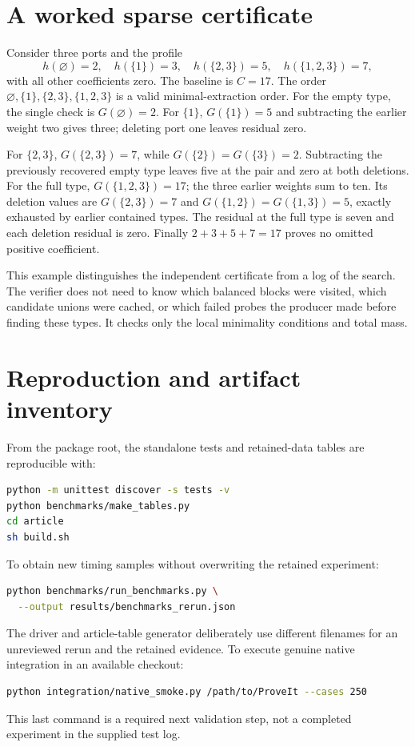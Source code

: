 \documentclass[11pt]{article}
\theoremstyle{definition}
\begin{document}
\appendix
\section{A worked sparse certificate}
\label{app:example}
Consider three ports and the profile
\[
 h(\varnothing)=2,\quad h(\{1\})=3,\quad
 h(\{2,3\})=5,\quad h(\{1,2,3\})=7,
\]
with all other coefficients zero. The baseline is $C=17$. The order
$\varnothing,\{1\},\{2,3\},\{1,2,3\}$ is a valid minimal-extraction order.
For the empty type, the single check is $G(\varnothing)=2$. For $\{1\}$,
$G(\{1\})=5$ and subtracting the earlier weight two gives three; deleting
port one leaves residual zero.

For $\{2,3\}$, $G(\{2,3\})=7$, while
$G(\{2\})=G(\{3\})=2$. Subtracting the previously recovered empty type
leaves five at the pair and zero at both deletions. For the full type,
$G(\{1,2,3\})=17$; the three earlier weights sum to ten. Its deletion values
are $G(\{2,3\})=7$ and
$G(\{1,2\})=G(\{1,3\})=5$, exactly exhausted by earlier contained types.
The residual at the full type is seven and each deletion residual is zero.
Finally $2+3+5+7=17$ proves no omitted positive coefficient.

This example distinguishes the independent certificate from a log of the
search. The verifier does not need to know which balanced blocks were
visited, which candidate unions were cached, or which failed probes the
producer made before finding these types. It checks only the local
minimality conditions and total mass.

\section{Reproduction and artifact inventory}
\label{app:reproduce}
From the package root, the standalone tests and retained-data tables are
reproducible with:
\begin{lstlisting}[language=bash]
python -m unittest discover -s tests -v
python benchmarks/make_tables.py
cd article
sh build.sh
\end{lstlisting}
To obtain new timing samples without overwriting the retained experiment:
\begin{lstlisting}[language=bash]
python benchmarks/run_benchmarks.py \
  --output results/benchmarks_rerun.json
\end{lstlisting}
The driver and article-table generator deliberately use different filenames
for an unreviewed rerun and the retained evidence. To execute genuine native
integration in an available checkout:
\begin{lstlisting}[language=bash]
python integration/native_smoke.py /path/to/ProveIt --cases 250
\end{lstlisting}
This last command is a required next validation step, not a completed
experiment in the supplied test log.
\end{document}
